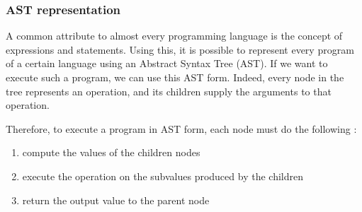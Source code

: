 \documentclass[twoside,11pt,a4paper]{article}
\newcommand{\java}[1]{\textsf{#1}}
\begin{document}



\subsubsection{AST representation}


A common attribute to almost every programming language is the concept of expressions and statements. Using this, it is possible to represent every program of a certain language using an Abstract Syntax Tree (AST). If we want to execute such a program, we can use this AST form. Indeed, every node in the tree represents an operation, and its children supply the arguments to that operation.

Therefore, to execute a program in AST form, each node must do the following :
\begin{enumerate}
\item compute the values of the children nodes
\item execute the operation on the subvalues produced by the children
\item return the output value to the parent node
\end{enumerate}
\end{document}
